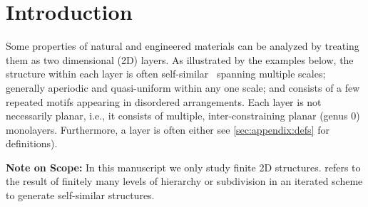 \section{Introduction}
\label{sec:intro}

\newcommand{\seedefs}{(formally defined in \ref{sec:appendix:defs})}
\newcommand{\seedefsb}{(see \ref{sec:appendix:defs} for definitions)}
\newcommand{\seedefsc}{See \ref{sec:appendix:defs} for formal definitions}
\newcommand{\seedefsd}{see \ref{sec:appendix:defs} for definitions}
\newcommand{\seedefsprelim}{(formally defined in Section \ref{sec:prelim})}


Some properties of natural and engineered materials can be analyzed by treating them as two dimensional (2D) layers. As illustrated by the examples below, the structure within each layer is often self-similar~\cite{2012arXiv1204.6389G} spanning multiple scales; generally aperiodic and quasi-uniform within any one scale; and consists of a few repeated motifs appearing in disordered arrangements. Each layer is not necessarily planar, i.e., it consists of multiple, inter-constraining planar (genus 0) monolayers. Furthermore, a layer is often  either
\cutout{,} \addin{(}\addin{,}
\cutout{(}\seedefsd).

\noindent
\textbf{Note on Scope:} In this manuscript we only study finite 2D structures.  refers to the result of finitely many levels of hierarchy or subdivision in an iterated scheme to generate self-similar structures.




